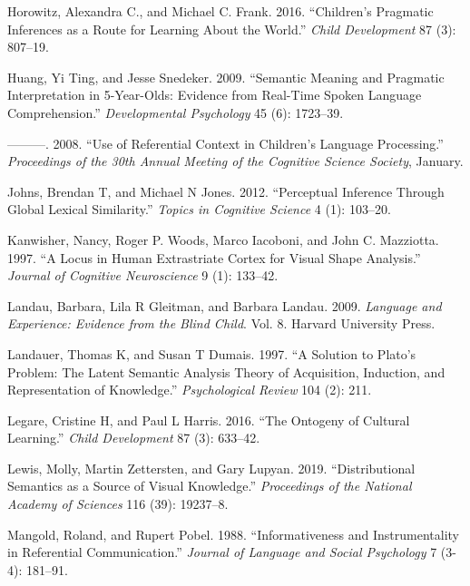 \documentclass{ucetd}
\newlength{\cslhangindent}
\newenvironment{cslreferences}%
{\setlength{\parindent}{0pt}%
\everypar{\setlength{\hangindent}{\cslhangindent}}\ignorespaces}%
{\par}
\begin{document}
\begin{cslreferences}
\leavevmode\hypertarget{ref-horowitz_childrens_2016}{}%
Horowitz, Alexandra C., and Michael C. Frank. 2016. ``Children's
Pragmatic Inferences as a Route for Learning About the World.''
\emph{Child Development} 87 (3): 807--19.

\leavevmode\hypertarget{ref-huang_semantic_2009}{}%
Huang, Yi Ting, and Jesse Snedeker. 2009. ``Semantic Meaning and
Pragmatic Interpretation in 5-Year-Olds: Evidence from Real-Time Spoken
Language Comprehension.'' \emph{Developmental Psychology} 45 (6):
1723--39.

\leavevmode\hypertarget{ref-huangsnedeker2008}{}%
---------. 2008. ``Use of Referential Context in Children's Language
Processing.'' \emph{Proceedings of the 30th Annual Meeting of the
Cognitive Science Society}, January.

\leavevmode\hypertarget{ref-johns2012}{}%
Johns, Brendan T, and Michael N Jones. 2012. ``Perceptual Inference
Through Global Lexical Similarity.'' \emph{Topics in Cognitive Science}
4 (1): 103--20.

\leavevmode\hypertarget{ref-kanwisher}{}%
Kanwisher, Nancy, Roger P. Woods, Marco Iacoboni, and John C. Mazziotta.
1997. ``A Locus in Human Extrastriate Cortex for Visual Shape
Analysis.'' \emph{Journal of Cognitive Neuroscience} 9 (1): 133--42.

\leavevmode\hypertarget{ref-landau2009}{}%
Landau, Barbara, Lila R Gleitman, and Barbara Landau. 2009.
\emph{Language and Experience: Evidence from the Blind Child}. Vol. 8.
Harvard University Press.

\leavevmode\hypertarget{ref-landauer1997}{}%
Landauer, Thomas K, and Susan T Dumais. 1997. ``A Solution to Plato's
Problem: The Latent Semantic Analysis Theory of Acquisition, Induction,
and Representation of Knowledge.'' \emph{Psychological Review} 104 (2):
211.

\leavevmode\hypertarget{ref-legare2016}{}%
Legare, Cristine H, and Paul L Harris. 2016. ``The Ontogeny of Cultural
Learning.'' \emph{Child Development} 87 (3): 633--42.

\leavevmode\hypertarget{ref-lewis2019}{}%
Lewis, Molly, Martin Zettersten, and Gary Lupyan. 2019. ``Distributional
Semantics as a Source of Visual Knowledge.'' \emph{Proceedings of the
National Academy of Sciences} 116 (39): 19237--8.

\leavevmode\hypertarget{ref-mangold_informativeness_1988}{}%
Mangold, Roland, and Rupert Pobel. 1988. ``Informativeness and
Instrumentality in Referential Communication.'' \emph{Journal of
Language and Social Psychology} 7 (3-4): 181--91.


\end{cslreferences}
\end{document}
